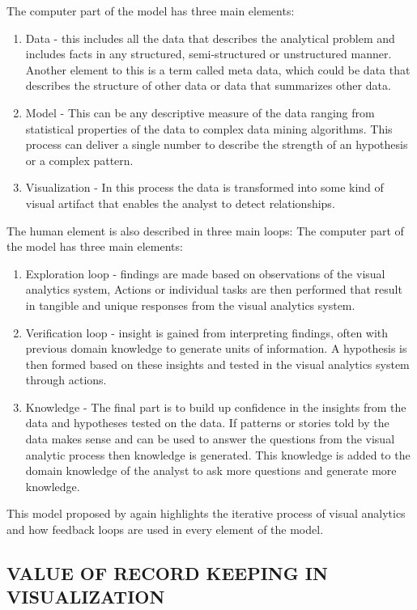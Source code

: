 The computer part of the model has three main elements:
\begin{enumerate}
	\item Data - this includes all the data that describes the analytical problem and includes facts in any structured, semi-structured or unstructured manner. Another element to this is a term called meta data, which could be data that describes the structure of other data or data that summarizes other data.
	\item Model - This can be any descriptive measure of the data ranging from statistical properties of the data to complex data mining algorithms. This process can deliver a single number to describe the strength of an hypothesis or a complex pattern.
	\item Visualization - In this process the data is transformed into some kind of visual artifact that enables the analyst to detect relationships.
\end{enumerate}
The human element is also described in three main loops:
The computer part of the model has three main elements:
\begin{enumerate}
	\item Exploration loop - findings are made based on observations of the visual analytics system, Actions or individual tasks are then performed that result in tangible  and unique responses from the visual analytics system. 
	\item Verification loop - insight is gained from interpreting findings, often with previous domain knowledge to generate units of information. A hypothesis is then formed based on these insights and tested in the visual analytics system through actions.
	\item Knowledge - The final part is to build up confidence in the insights from the data and hypotheses tested on the data. If  patterns or stories told by the data makes sense and can be used to answer the questions from the visual analytic process then knowledge is generated. This knowledge is added to the domain knowledge of the analyst to ask more questions and generate more knowledge.
\end{enumerate}
This model proposed by \cite{sacha2014knowledge} again highlights the iterative process of visual analytics and how feedback loops are used in every element of the model.

\subsection{VALUE OF RECORD KEEPING IN VISUALIZATION}


